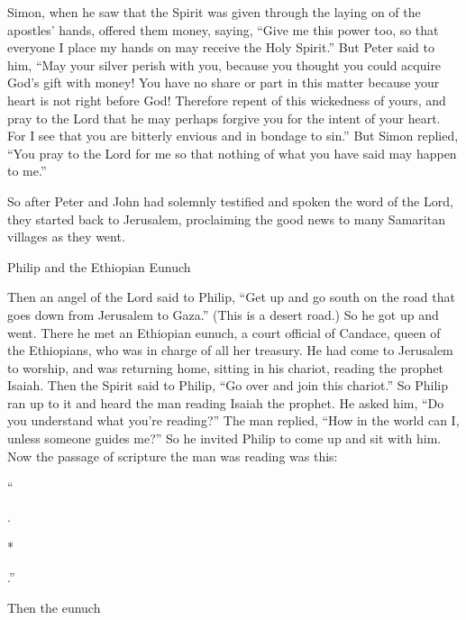 {Simon,
when
he saw
that
the Spirit
was given
through
the laying
on of the apostles’
hands,
offered
them
money,
saying,
“Give
me
this
power
too, so that
everyone
I place
my hands
on may receive
the Holy
Spirit.”
But
Peter
said
to
him,
“May
your
silver
perish
with
you,
because
you thought
you could acquire
God’s
gift
with
money!
You
have no
share
or
part
in
this
matter
because
your
heart
is
not
right
before
God!
Therefore
repent
of this
wickedness
of yours,
and
pray
to the Lord
that
he may perhaps forgive
you
for the intent
of your
heart.
For
I see
that you
are
bitterly
envious
and
in bondage
to sin.”
But
Simon
replied, “You
pray
to
the Lord
for
me
so
that nothing
of what
you have said
may happen
to
me.”
\par }{\PP {}So
after Peter and John had solemnly testified
and
spoken
the word
of the Lord,
they started back
to
Jerusalem,
proclaiming the good news
to many
Samaritan
villages as they went.
\par }{\SH Philip and the Ethiopian Eunuch
\par }{\PP {}Then
an angel
of
the Lord
said
to
Philip, “Get up
and
go
south
on
the road
that goes down
from
Jerusalem
to
Gaza.”
(This
is
a desert road.)
So
he got up
and went.
There he met an Ethiopian
eunuch,
a court official
of Candace,
queen
of
the Ethiopians,
who
was
in charge
of all
her
treasury.
He had come
to Jerusalem
to worship,
and
was
returning home,
sitting
in
his
chariot,
reading
the prophet
Isaiah.
Then
the Spirit
said
to Philip,
“Go over
and
join
this
chariot.”
So
Philip
ran up
to it and heard
the man
reading
Isaiah
the prophet.
He
asked
him, “Do you understand
what
you’re reading?”
The man replied,
“How
in the world can I,
unless
someone
guides
me?” So
he invited
Philip
to come up
and sit
with
him.
Now
the passage
of scripture
the man was
reading
was
this:
\par }{\Q “{}
\par }{
\par }{.
\par }{\Q {}*
\par }{
\par }{.”
\par }{\PP {}Then
the eunuch
}
